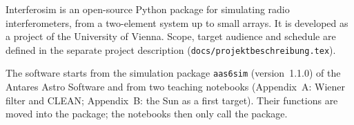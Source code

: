 
Interferosim is an open-source Python package for simulating radio
interferometers, from a two-element system up to small arrays. It is
developed as a project of the University of Vienna. Scope, target
audience and schedule are defined in the separate project description
(\texttt{docs/projektbeschreibung.tex}).

The software starts from the simulation package \texttt{aas6sim}
(version~1.1.0) of the Antares Astro Software and from two teaching
notebooks (Appendix~A: Wiener filter and CLEAN; Appendix~B: the Sun as
a first target). Their functions are moved into the package; the
notebooks then only call the package.
